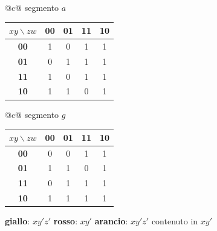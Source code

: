 \documentclass[12pt, a4paper]{article}
\begin{document}
\begin{center}
\renewcommand{\arraystretch}{1.25}
\begin{tabular}[t]{@{}c@{}}
segmento $a$\\[3pt]
\begin{tabular}[t]{|c|c|c|c|c|}
\hline
\colorbox{gray!25}{\color{black}$xy\backslash zw$} & \colorbox{gray!25}{\color{black}\textbf{00}} & \colorbox{gray!25}{\color{black}\textbf{01}} & \colorbox{gray!25}{\color{black}\textbf{11}} & \colorbox{gray!25}{\color{black}\textbf{10}} \\ \hline
\colorbox{gray!25}{\color{black}\textbf{00}} & 1 & 0 & 1 & 1 \\ \hline
\colorbox{gray!25}{\color{black}\textbf{01}} & 0 & 1 & 1 & 1 \\ \hline
\colorbox{gray!25}{\color{black}\textbf{11}} & 1 & 0 & 1 & 1 \\ \hline
\colorbox{gray!25}{\color{black}\textbf{10}} & \colorbox{yellow!55}{\color{black}1} & \colorbox{yellow!55}{\color{black}1} & 0 & 1 \\ \hline
\end{tabular}
\end{tabular}
\qquad
\begin{tabular}[t]{@{}c@{}}
segmento $g$\\[3pt]
\begin{tabular}[t]{|c|c|c|c|c|}
\hline
\colorbox{gray!25}{\color{black}$xy\backslash zw$} & \colorbox{gray!25}{\color{black}\textbf{00}} & \colorbox{gray!25}{\color{black}\textbf{01}} & \colorbox{gray!25}{\color{black}\textbf{11}} & \colorbox{gray!25}{\color{black}\textbf{10}} \\ \hline
\colorbox{gray!25}{\color{black}\textbf{00}} & 0 & 0 & 1 & 1 \\ \hline
\colorbox{gray!25}{\color{black}\textbf{01}} & 1 & 1 & 0 & 1 \\ \hline
\colorbox{gray!25}{\color{black}\textbf{11}} & 0 & 1 & 1 & 1 \\ \hline
\colorbox{gray!25}{\color{black}\textbf{10}} & \colorbox{orange!55}{\color{black}1} & \colorbox{orange!55}{\color{black}1} & \colorbox{red!25}{\color{black}1} & \colorbox{red!25}{\color{black}1} \\ \hline
\end{tabular}
\end{tabular}
\end{center}
\begin{center}
\textcolor{yellow!50!black}{\textbf{giallo}}: $xy'z'$ \qquad \textcolor{red!80!black}{\textbf{rosso}}: $xy'$ \qquad \textcolor{orange!90!black}{\textbf{arancio}}: $xy'z'$ contenuto in $xy'$
\end{center}
\end{document}

